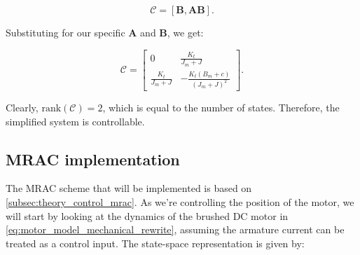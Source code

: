 \begin{equation}
    \label{eq:model_controllability}
    \mathcal{C} = [\mathbf{B}, \mathbf{A}\mathbf{B}].
\end{equation}

Substituting for our specific $\mathbf{A}$ and $\mathbf{B}$, we get:

\begin{equation}
    \mathcal{C} = 
    \begin{bmatrix}
        0 & \frac{K_t}{J_m+J}\\
        \frac{K_t}{J_m+J} & -\frac{K_t (B_m+c)}{(J_m+J)^2}
    \end{bmatrix}.
\end{equation}

Clearly, $\mathrm{rank}(\mathcal{C}) = 2$, which is equal to the number of states. Therefore, the simplified system is controllable.

\subsection{MRAC implementation}%
\label{subsec:controller_design_mrac_implementation}

The MRAC scheme that will be implemented is based on \cref{subsec:theory_control_mrac}. As we're controlling the position of the motor, we will start by looking at the dynamics of the brushed DC motor in \cref{eq:motor_model_mechanical_rewrite}, assuming the armature current can be treated as a control input. The state-space representation is given by:

